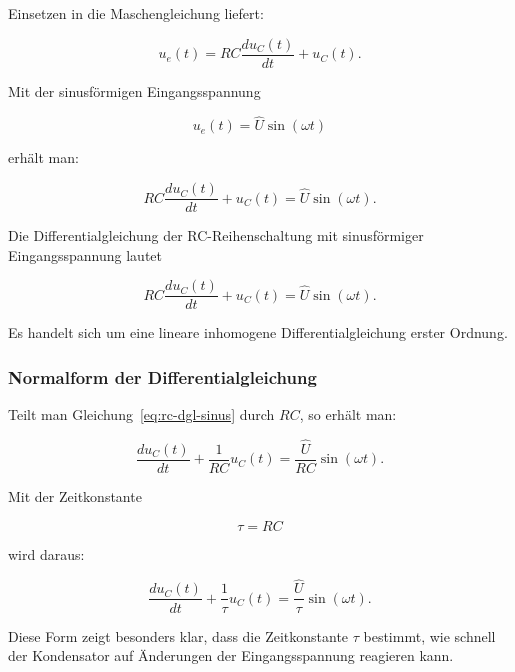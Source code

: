 Einsetzen in die Maschengleichung liefert:

\begin{equation}
	u_e(t)
	=
	RC \frac{du_C(t)}{dt}
	+
	u_C(t).
	\label{eq:rc-dgl-allgemein}
\end{equation}

Mit der sinusförmigen Eingangsspannung

\[
u_e(t)=\hat{U}\sin(\omega t)
\]

erhält man:

\begin{equation}
	RC \frac{du_C(t)}{dt}
	+
	u_C(t)
	=
	\hat{U}\sin(\omega t).
	\label{eq:rc-dgl-sinus}
\end{equation}

\begin{MathBox}
	\label{box:rc-dgl-sinus}
	Die Differentialgleichung der RC-Reihenschaltung mit sinusförmiger
	Eingangsspannung lautet
	
	\[
	RC \frac{du_C(t)}{dt}
	+
	u_C(t)
	=
	\hat{U}\sin(\omega t).
	\]
	
	Es handelt sich um eine lineare inhomogene Differentialgleichung erster
	Ordnung.
\end{MathBox}

\subsubsection{Normalform der Differentialgleichung}
\label{subsubsec:rc-sinus-normalform}

Teilt man Gleichung~\eqref{eq:rc-dgl-sinus} durch \(RC\), so erhält man:

\begin{equation}
	\frac{du_C(t)}{dt}
	+
	\frac{1}{RC}u_C(t)
	=
	\frac{\hat{U}}{RC}\sin(\omega t).
	\label{eq:rc-dgl-sinus-normalform}
\end{equation}

Mit der Zeitkonstante

\begin{equation}
	\tau = RC
	\label{eq:rc-zeitkonstante}
\end{equation}

wird daraus:

\begin{equation}
	\frac{du_C(t)}{dt}
	+
	\frac{1}{\tau}u_C(t)
	=
	\frac{\hat{U}}{\tau}\sin(\omega t).
	\label{eq:rc-dgl-sinus-normalform-tau}
\end{equation}

Diese Form zeigt besonders klar, dass die Zeitkonstante \(\tau\) bestimmt,
wie schnell der Kondensator auf Änderungen der Eingangsspannung reagieren kann.

